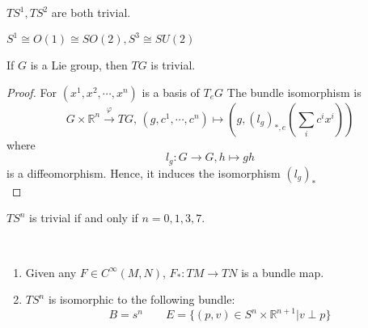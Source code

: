 \begin{example}
    $ TS^1,TS^2 $ are both trivial.
    
     $ S^1\cong O(1)\cong SO(2),S^3\cong SU(2) $ 
\end{example}
\begin{theorem}
   If  $ G  $ is a Lie group, then  $ TG  $ is trivial.
\end{theorem}
\begin{proof}
    For $(x^1,x^2,\cdots,x^n)$ is a basis of $T_eG$
    The bundle isomorphism is 
    \[G\times \mathbb{R}^n\xrightarrow{\varphi}TG,\, (g,c^1,\cdots,c^n)\mapsto (g,(l_g)_{*,e}(\sum_ic^ix^i))\] 
    where 
    \[l_g:G\rightarrow G, h\mapsto gh\]
    is a diffeomorphism. Hence, it induces the isomorphism $(l_g)_*$\\
\end{proof}
\begin{proposition}[Adams, 1960s]
    $ TS^n  $ is trivial if and only if  $ n=0,1,3,7 $. 
\end{proposition}
\begin{proposition}
    \,
   \begin{enumerate}
       \item Given any  $ F\in C^\infty(M,N) $,  $ F_*:TM\rightarrow TN $ is a bundle map.
       \item  $ TS^n $ is isomorphic to the following bundle:
        \[B=s^n\qquad E=\{(p,v)\in S^n\times \mathbb{R}^{n+1}|v\perp p\}\]   
   \end{enumerate}
\end{proposition}
